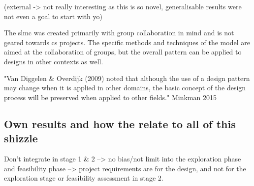 (external -> not really interesting as this is so novel, generalisable results were not even a goal to start with yo)

The \acrfull{slmc} was created primarily with group collaboration in mind and is not geared towards \acrshort*{cs} projects. The specific methods and techniques of the model are aimed at the collaboration of groups, but the overall pattern can be applied to designs in other contexts as well. 

"Van Diggelen & Overdijk (2009) noted that although the use of a design pattern may change when it is applied in other domains, the basic concept of the design process will be preserved when applied to other fields." Minkman 2015

\subsection{Own results and how the relate to all of this shizzle}
Don't integrate in stage 1 \& 2 --> no bias/not limit into the exploration phase and feasibility phase --> project requirements are for the design, and not for the exploration stage or feasibility assessment in stage 2.



